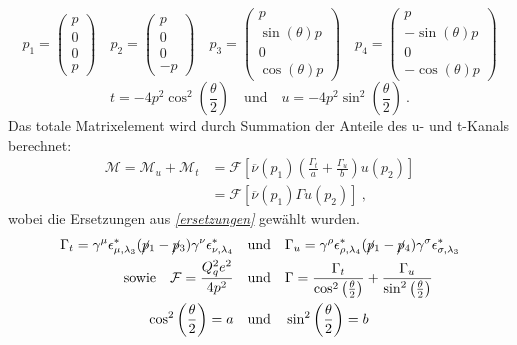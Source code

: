 \begin{equation}
p_1 = \left(\begin{array}{c}p \\ 0 \\ 0 \\ p\end{array}\right) \quad 	p_2 = \left(\begin{array}{c}p \\ 0 \\ 0 \\ -p\end{array}\right) \quad p_3 = \left(\begin{array}{c}p \\ \sin(\theta)p \\ 0 \\ \cos(\theta)p \end{array}\right) \quad p_4 = \left(\begin{array}{c}p \\ -\sin(\theta)p \\ 0 \\ -\cos(\theta)p \end{array}\right)
\label{vierervektoren}
\end{equation}
\begin{equation}
\label{Mandelstam}
t  = -4 p^2 \cos^2\left(\frac{\theta}{2}\right) \quad \text{und} \quad u = -4p^2 \sin^2\left(\frac{\theta}{2}\right)~.
\end{equation} 
Das totale Matrixelement wird durch Summation der Anteile des u- und t-Kanals berechnet: 
\begin{equation}
\begin{aligned}
\mathcal{M} = \mathcal{M}_u + \mathcal{M}_t &= \mathcal{F} \left[\overline{\nu}(p_1) \left(\frac{\Gamma_t}{a}  +
\frac{\Gamma_u}{b} \right) u(p_2) \right] \\
&= \mathcal{F} \left[ \overline{\nu}(p_1) \Gamma u(p_2)\right]~,
\end{aligned}
\end{equation}
wobei die Ersetzungen  aus \textit{\autoref{ersetzungen}} gewählt wurden.
\begin{equation}
\begin{split}
\Gamma_t = \gamma^\mu \epsilon^*_{\mu, \lambda_3} (\cancel{p}_1- \cancel{p}_3)  \gamma^\nu \epsilon^*_{\nu, \lambda_4} \quad &\text{und} \quad \Gamma_u = \gamma^\rho \epsilon^*_{\rho, \lambda_4} (\cancel{p}_1- \cancel{p}_4)  \gamma^\sigma \epsilon^*_{\sigma, \lambda_3} \\
\text{sowie} \quad \mathcal{F} = \frac{Q_q^2e^2}{4p^2} \quad &\text{und} \quad \Gamma = \frac{\Gamma_t}{\cos^2\left(\frac{\theta}{2}\right)}  +
\frac{\Gamma_u}{\sin^2\left(\frac{\theta}{2}\right)} \\
\cos^2\left(\frac{\theta}{2}\right) = a \quad &\text{und} \quad \sin^2\left(\frac{\theta}{2}\right) = b
\end{split}
\label{ersetzungen}
\end{equation}
